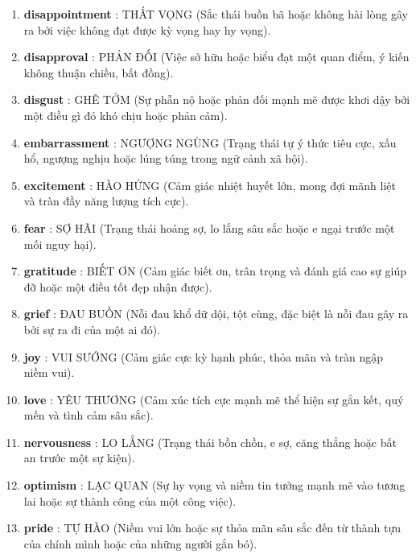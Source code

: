 \begin{enumerate}
	\item \textbf{disappointment} : THẤT VỌNG (Sắc thái buồn bã hoặc không hài lòng gây ra bởi việc không đạt được kỳ vọng hay hy vọng).
	
	\item \textbf{disapproval} : PHẢN ĐỐI (Việc sở hữu hoặc biểu đạt một quan điểm, ý kiến không thuận chiều, bất đồng).
	
	\item \textbf{disgust} : GHÊ TỞM (Sự phẫn nộ hoặc phản đối mạnh mẽ được khơi dậy bởi một điều gì đó khó chịu hoặc phản cảm).
	
	\item \textbf{embarrassment} : NGƯỢNG NGÙNG (Trạng thái tự ý thức tiêu cực, xấu hổ, ngượng nghịu hoặc lúng túng trong ngữ cảnh xã hội).
	
	\item \textbf{excitement} : HÀO HỨNG (Cảm giác nhiệt huyết lớn, mong đợi mãnh liệt và tràn đầy năng lượng tích cực).
	
	\item \textbf{fear} : SỢ HÃI (Trạng thái hoảng sợ, lo lắng sâu sắc hoặc e ngại trước một mối nguy hại).
	
	\item \textbf{gratitude} : BIẾT ƠN (Cảm giác biết ơn, trân trọng và đánh giá cao sự giúp đỡ hoặc một điều tốt đẹp nhận được).
	
	\item \textbf{grief} : ĐAU BUỒN (Nỗi đau khổ dữ dội, tột cùng, đặc biệt là nỗi đau gây ra bởi sự ra đi của một ai đó).
	
	\item \textbf{joy} : VUI SƯỚNG (Cảm giác cực kỳ hạnh phúc, thỏa mãn và tràn ngập niềm vui).
	
	\item \textbf{love} : YÊU THƯƠNG (Cảm xúc tích cực mạnh mẽ thể hiện sự gắn kết, quý mến và tình cảm sâu sắc).
	
	\item \textbf{nervousness} : LO LẮNG (Trạng thái bồn chồn, e sợ, căng thẳng hoặc bất an trước một sự kiện).
	
	\item \textbf{optimism} : LẠC QUAN (Sự hy vọng và niềm tin tưởng mạnh mẽ vào tương lai hoặc sự thành công của một công việc).
	
	\item \textbf{pride} : TỰ HÀO (Niềm vui lớn hoặc sự thỏa mãn sâu sắc đến từ thành tựu của chính mình hoặc của những người gắn bó).
	

\end{enumerate}
